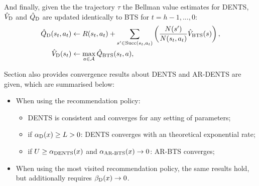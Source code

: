         And finally, given the the trajectory $\tau$ the Bellman value estimates for DENTS, ${\hat{V}_{{\textnormal{D}}}}$ and ${\hat{Q}_{{\textnormal{D}}}}$ are updated identically to BTS for $t=h-1,...,0$:
        \begin{align}
            {\hat{Q}_{{\textnormal{D}}}}(s_t,a_t) &\leftarrow 
                R(s_t,a_t) + \sum_{s' \in {\textnormal{Succ}(s_t,a_t)}} \left( \frac{N(s')}{N(s_t,a_t)} {\hat{V}_{{\textnormal{BTS}}}}(s) \right), 
                        \label{eq:dents_q_backup} \\ 
            {\hat{V}_{{\textnormal{D}}}}(s_t) &\leftarrow \max_{a\in\mathcal{A}} {\hat{Q}_{{\textnormal{BTS}}}}(s_t,a), 
                        \label{eq:dents_v_backup} 
        \end{align}


        










        Section  also provides convergence results about DENTS and AR-DENTS are given, which are summarised below:
        \begin{itemize}
            \item When using the  recommendation policy:
            \begin{itemize}
                \item DENTS is consistent and converges for any setting of parameters;
                \item if ${\alpha_{{\textnormal{D}}}}(x) \geq L > 0$: DENTS converges with an theoretical exponential rate;
                \item if $U \geq {\alpha_{{\textnormal{DENTS}}}}(x)$ and ${\alpha_{{\textnormal{AR-BTS}}}}(x) \rightarrow 0$: AR-BTS converges;
            \end{itemize}
            \item When using the most visited recommendation policy, the same results hold, but additionally requires ${\beta_{{\textnormal{D}}}}(x)\rightarrow 0$.
        \end{itemize}











